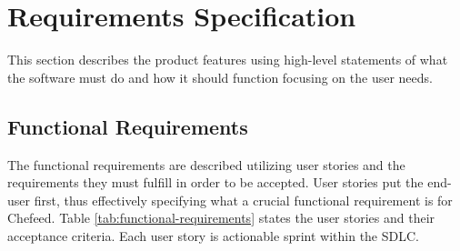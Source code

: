 \section{Requirements Specification}
This section describes the product features using high-level statements of what the software must do and how it should function focusing on the user needs.

\subsection{Functional Requirements}
The functional requirements are described utilizing user stories and the requirements they must fulfill in order to be accepted. User stories put the end-user first, thus effectively specifying what a crucial functional requirement is for Chefeed. Table \ref{tab:functional-requirements} states the user stories and their acceptance criteria. Each user story is actionable sprint within the SDLC.



